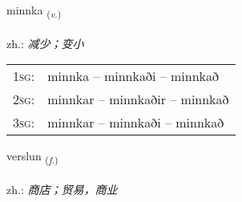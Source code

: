 \documentclass[frontgrid, backgrid]{flacards}\usepackage[]{graphicx}\usepackage[]{xcolor}
\begin{document}
\renewcommand{\flhead}{\vskip5pt \fboxsep=0pt {\small\bfseries\footnotesize Sagnorð | 动词}}
\renewcommand{\fcfoot}{\vskip5pt \fboxsep=0pt \hspace{2pt}{\small\bfseries\footnotesize 1K}}

\renewcommand{\blhead}{\vskip5pt {\small\bfseries\footnotesize Sagnorð | 动词 }}
\renewcommand{\bcfoot}{\vskip5pt \hspace{2pt}{\small\bfseries\footnotesize 1K}}


{minnka \small{\textsubscript{(\textit{v.})}} \\[1ex] %
\textphonetic{[miŋ̥ka]} \\
zh.: \emph{减少；变小} \\  [2ex]
\renewcommand*{\arraystretch}{0.8}
\begin{tabular}{p{1cm}l}
\textsc{1sg}: & minnka -- minnkaði -- minnkað \\ 
\textsc{2sg}: & minnkar -- minnkaðir -- minnkað \\ 
\textsc{3sg}: & minnkar -- minnkaði -- minnkað \\ 
\end{tabular}
}

\renewcommand{\flhead}{\vskip5pt \fboxsep=0pt {\small\bfseries\footnotesize Nafnorð | 名词}}
\renewcommand{\fcfoot}{\vskip5pt \fboxsep=0pt \hspace{2pt}{\small\bfseries\footnotesize 1K}}

\renewcommand{\blhead}{\vskip5pt {\small\bfseries\footnotesize Nafnorð | 名词 }}
\renewcommand{\bcfoot}{\vskip5pt \hspace{2pt}{\small\bfseries\footnotesize 1K}}


{verslun \small{\textsubscript{(\textit{f.})}} \\[1ex] %
 \\
zh.: \emph{商店；贸易，商业} \\  [2ex]
\renewcommand*{\arraystretch}{0.8}
}
\end{document}
